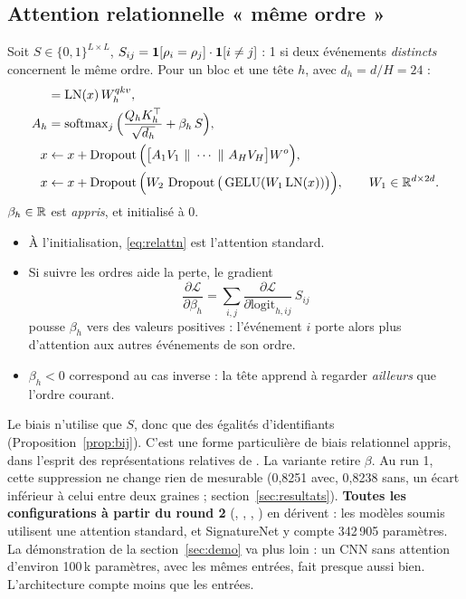 \subsection{Attention relationnelle « même ordre »}
Soit $S\in\{0,1\}^{L\times L}$, $S_{ij}=\mathbf{1}\!\left[\rho_i=\rho_j\right]\cdot\mathbf{1}\!\left[i\neq j\right]$ : 1 si deux événements \emph{distincts} concernent le même ordre. Pour un bloc et une tête $h$, avec $d_h=d/H=24$ :
\begin{align}
[Q_h,K_h,V_h]&=\LN(x)\,W^{qkv}_h,\\
A_h&=\softmax_j\Big(\frac{Q_hK_h^\top}{\sqrt{d_h}}+\beta_h\,S\Big),\label{eq:relattn}\\
x&\leftarrow x+\operatorname{Dropout}\Big(\big[A_1V_1\ \|\ \cdots\ \|\ A_HV_H\big]W^{o}\Big),\\
x&\leftarrow x+\operatorname{Dropout}\Big(W_2\,\operatorname{Dropout}\big(\GELU(W_1\LN(x))\big)\Big),\qquad W_1\in\R^{d\times2d}.
\end{align}
$\beta_h\in\mathbb{R}$ est \emph{appris}, et initialisé à 0.
\begin{itemize}
\item À l'initialisation, \eqref{eq:relattn} est l'attention standard.
\item Si suivre les ordres aide la perte, le gradient
\begin{equation}
\frac{\partial\mathcal{L}}{\partial\beta_h}=\sum_{i,j}\frac{\partial\mathcal{L}}{\partial\text{logit}_{h,ij}}\,S_{ij}
\end{equation}
pousse $\beta_h$ vers des valeurs positives : l'événement $i$ porte alors plus d'attention aux autres événements de son ordre.
\item $\beta_h<0$ correspond au cas inverse : la tête apprend à regarder \emph{ailleurs} que l'ordre courant.
\end{itemize}
Le biais n'utilise que $S$, donc que des égalités d'identifiants (Proposition~\ref{prop:bij}). C'est une forme particulière de biais relationnel appris, dans l'esprit des représentations relatives de \cite{shaw}. La variante  retire $\beta$. Au run 1, cette suppression ne change rien de mesurable (0,8251 avec, 0,8238 sans, un écart inférieur à celui entre deux graines ; section~\ref{sec:resultats}). \textbf{Toutes les configurations à partir du round 2} (, , , ) en dérivent : les modèles soumis utilisent une attention standard, et SignatureNet y compte 342\,905 paramètres. La démonstration de la section~\ref{sec:demo} va plus loin : un CNN sans attention d'environ 100\,k paramètres, avec les mêmes entrées, fait presque aussi bien. L'architecture compte moins que les entrées.

